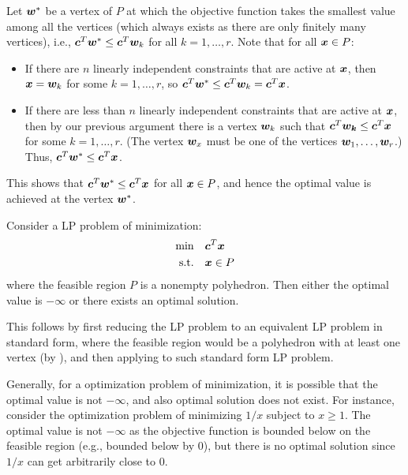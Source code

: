 \begin{enumerate}
\begin{pf}
Let \(\bm{w}^{*}\) be a vertex of \(P\) at which the objective function
takes the smallest value among all the vertices (which always exists as there
are only finitely many vertices), i.e.,
\(\bm{c}^{T}\bm{w}^{*}\le\bm{c}^{T}\bm{w}_k\) for all \(k=1,\dotsc,r\).
Note that for all \(\bm{x}\in P\): 
\begin{itemize}
\item If there are \(n\) linearly independent constraints that are active at
\(\bm{x}\), then \(\bm{x}=\bm{w}_k\) for some \(k=1,\dotsc,r\), so
\(\bm{c}^{T}\bm{w}^*\le\bm{c}^{T}\bm{w}_k=\bm{c}^{T}\bm{x}\).
\item If there are less than \(n\) linearly independent constraints that are
active at \(\bm{x}\), then by our previous argument there is a vertex \(\bm{w}_k\)
such that \(\bm{c}^{T}\bm{w_{k}}\le\bm{c}^{T}\bm{x}\) for some
\(k=1,\dotsc,r\). (The vertex \(\bm{w}_x\) must be one of the vertices
\(\bm{w}_1,\dotsc,\bm{w}_r\).) Thus, \(\bm{c}^{T}\bm{w}^*\le\bm{c}^{T}\bm{x}\).
\end{itemize}
This shows that \(\bm{c}^{T}\bm{w}^*\le\bm{c}^{T}\bm{x}\) for all
\(\bm{x}\in P\), and hence the optimal value is achieved at the vertex
\(\bm{w}^*\).
\end{pf}
\begin{corollary}
\label{cor:lp-optimal-exist}
Consider a LP problem of minimization:
\begin{align*}
\text{min}\quad&\bm{c}^{T}\bm{x} \\
\text{s.t.}\quad&\bm{x}\in P
\end{align*}
where the feasible region \(P\) is a nonempty polyhedron. Then either the
optimal value is \(-\infty\) or there exists an optimal solution.
\end{corollary}
\begin{pf}
This follows by first reducing the LP problem to an equivalent LP problem in
standard form, where the feasible region would be a polyhedron with at least
one vertex (by ), and then applying
 to such standard form LP problem.
\end{pf}

\begin{note}
Generally, for a optimization problem of minimization, it is possible that the
optimal value is not \(-\infty\), and also optimal solution does not exist. For
instance, consider the optimization problem of minimizing \(1/x\) subject to
\(x\ge 1\). The optimal value is not \(-\infty\) as the objective function is
bounded below on the feasible region (e.g., bounded below by \(0\)), but there
is no optimal solution since \(1/x\) can get arbitrarily close to \(0\).
\end{note}
\end{enumerate}
